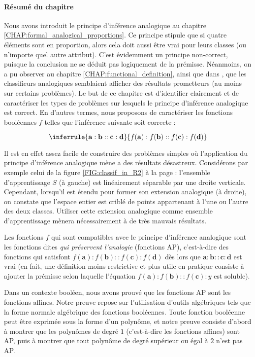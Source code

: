 \paragraph{Résumé du chapitre}

Nous avons introduit le principe d'inférence analogique au chapitre
\ref{CHAP:formal_analogical_proportions}. Ce principe stipule que si quatre
éléments sont en proportion, alors cela doit aussi être vrai pour leurs classes
(ou n'importe quel autre attribut). C'est évidemment un principe non-correct,
puisque la conclusion ne se déduit pas logiquement de la prémisse. Néanmoins,
on a pu observer au chapitre \ref{CHAP:functional_definition}, ainsi que dans
\cite{BayMicDelIJCAI07}, que les classifieurs analogiques semblaient afficher
des résultats prometteurs (au moins sur certains problèmes). Le but de ce
chapitre est d'identifier clairement et de caractériser les types de problèmes
sur lesquels le principe d'inférence analogique est correct. En d'autres
termes, nous proposons de caractériser les fonctions booléennes $f$ telles que
l'inférence suivante soit correcte :

$$
\inferrule{\mathbf{a} : \mathbf{b} :: \mathbf{c} : \mathbf{d}}{ f(\mathbf{a}) :
f(\mathbf{b}) :: f(\mathbf{c}) : f(\mathbf{d})}
$$

Il est en effet assez facile de construire des problèmes simples où
l'application du principe d'inférence analogique mène a des résultats
désastreux. Considérons par exemple celui de la figure \ref{FIG:classif_in_R2}
à la page \pageref{FIG:classif_in_R2} :
l'ensemble d'apprentissage $S$ (à gauche) est linéairement séparable par une
droite verticale. Cependant, lorsqu'il est étendu pour former son extension
analogique (à droite), on constate que l'espace entier est criblé de points
appartenant à l'une ou l'autre des deux classes. Utiliser cette extension
analogique comme ensemble d'apprentissage mènera nécessairement à de très
mauvais résultats.

Les fonctions $f$ qui sont compatibles avec le principe d'inférence analogique
sont les fonctions dites \textit{qui préservent l'analogie} (fonctions AP),
c'est-à-dire des fonctions qui satisfont $f(\mathbf{a}) :f(\mathbf{b})::
f(\mathbf{c}): f(\mathbf{d})$  dès lors que
$\mathbf{a}:\mathbf{b}::\mathbf{c}:\mathbf{d}$ est vrai (en fait, une
définition moins restrictive et plus utile en pratique consiste à ajouter la
prémisse selon laquelle l'équation $f(\mathbf{a}) :f(\mathbf{b}):: f(\mathbf{c}):y$ est
soluble).


Dans un contexte booléen, nous avons prouvé que les fonctions AP sont les
fonctions affines. Notre preuve repose sur l'utilisation d'outils algébriques
tels que la forme normale algébrique des fonctions booléennes. Toute fonction
booléenne peut être exprimée sous la forme d'un polynôme, et notre preuve
consiste d'abord  à montrer que les polynômes de degré $1$ (c'est-à-dire les
fonctions affines) sont AP, puis à montrer que tout polynôme de degré supérieur
ou égal à $2$ n'est pas AP.

